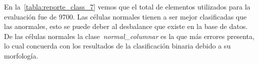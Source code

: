 En la~\autoref{tabla:reporte_class_7} vemos que el total de elementos utilizados
para la evaluación fue de 9700. Las células normales tienen a ser mejor clasificadas que
las anormales, esto se puede deber al desbalance que existe en la base de datos. De las
células normales la clase~\emph{normal\_columnar} es la que más errores presenta, lo cual
concuerda con los resultados de la clasificación binaria debido a su morfología.

\begin{table}[H]
    \centering
    \caption{Reporte de clasificación multi-clase}
    \label{tabla:reporte_class_}
    \end{table}


